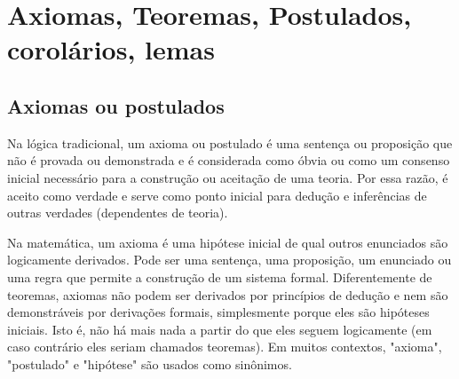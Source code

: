 

\cleardoublepage
{} %

\chapter{Axiomas, Teoremas, Postulados, corolários, lemas}
\label{cap_exemplos}

\begin{flushright}
	\showfont
\end{flushright}

\newpage


\section{Axiomas ou postulados}

Na lógica tradicional, um axioma ou postulado é uma sentença ou proposição que não é provada ou demonstrada e é considerada como óbvia ou como um consenso inicial necessário para a construção ou aceitação de uma teoria. Por essa razão, é aceito como verdade e serve como ponto inicial para dedução e inferências de outras verdades (dependentes de teoria).


Na matemática, um axioma é uma hipótese inicial de qual outros enunciados são logicamente derivados. Pode ser uma sentença, uma proposição, um enunciado ou uma regra que permite a construção de um sistema formal. Diferentemente de teoremas, axiomas não podem ser derivados por princípios de dedução e nem são demonstráveis por derivações formais, simplesmente porque eles são hipóteses iniciais. Isto é, não há mais nada a partir do que eles seguem logicamente (em caso contrário eles seriam chamados teoremas). Em muitos contextos, "axioma", "postulado" e "hipótese" são usados como sinônimos.


